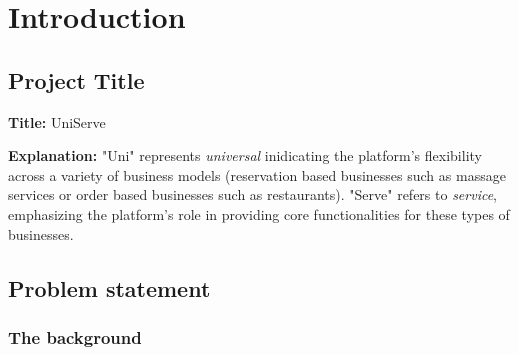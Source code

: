 \documentclass[]{VUMIFTemplateClass}
\begin{document}

\onehalfspacing


\singlespacing
{}


\tableofcontents
\onehalfspacing






\section{Introduction}
\subsection{Project Title}

\textbf{Title:} UniServe

\textbf{Explanation:} "Uni" represents \emph{universal} inidicating the platform's flexibility across a variety of business models 
(reservation based businesses such as massage services or order based businesses such as restaurants). 
"Serve" refers to \emph{service}, emphasizing the platform’s role in providing core functionalities for these types of businesses.

\subsection{Problem statement}

\subsubsection{The background}

\end{document}
